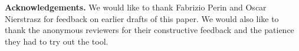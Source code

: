 \documentclass[preprint,12pt]{elsarticle}
\begin{document}
\vspace{0.5cm}
\footnotesize
{\bf Acknowledgements.} We would like to thank Fabrizio Perin and Oscar Nierstrasz for feedback on earlier drafts of this paper. We would also like to thank the anonymous reviewers for their constructive feedback and the patience they had to try out the tool.



\newpage

\footnotesize













\end{document}
